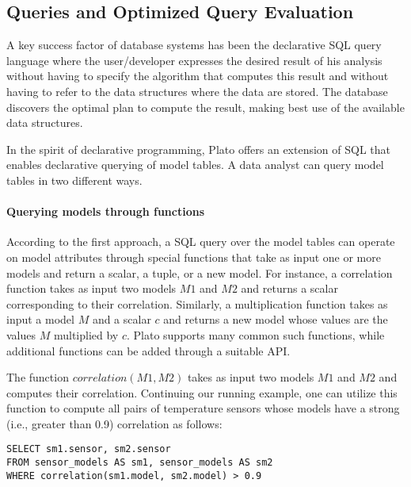 \subsection{Queries and Optimized Query Evaluation}
\label{sec:queries}

A key success factor of database systems has been the declarative SQL query language where the user/developer expresses the desired result of his analysis without having to specify the algorithm that computes this result and without having to refer to the data structures where the data are stored. The database discovers the optimal plan to compute the result, making best use of the available data structures. 

In the spirit of declarative programming, Plato offers an extension of SQL that enables declarative querying of model tables. A data analyst can query model tables in two different ways. \\

\paragraph{Querying models through functions} According to the first approach, a SQL query over the model tables can operate on model attributes through special functions that take as input one or more models and return a scalar, a tuple, or a new model. For instance, a correlation function takes as input two models $M1$ and $M2$ and returns a scalar corresponding to their correlation. Similarly, a multiplication function takes as input a model $M$ and a scalar $c$ and returns a new model whose values are the values $M$ multiplied by $c$. Plato supports many common such functions, while additional functions can be added through a suitable API.

\vspace*{0.5cm}
\begin{example}
The function $correlation(M1, M2)$ takes as input two models $M1$ and $M2$ and computes their correlation. Continuing our running example, one can utilize this function to compute all pairs of temperature sensors whose models have a strong (i.e., greater than 0.9) correlation as follows:
\begin{verbatim}
SELECT sm1.sensor, sm2.sensor
FROM sensor_models AS sm1, sensor_models AS sm2
WHERE correlation(sm1.model, sm2.model) > 0.9 
\end{verbatim}
\end{example}
\vspace*{0.5cm}

